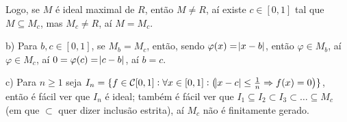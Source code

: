 \documentclass[10pt,a4paper]{article}
\begin{document}
\medskip
\noindent
Logo, se $M$ é ideal maximal de $R$, então $M\neq R$, aí existe $c\in[0,1]$ tal que $M\subseteq M_c$, mas $M_c\neq R$, aí $M=M_c$.

\medskip
\noindent
b) Para $b,c\in[0,1]$, se $M_b=M_c$, então, sendo $\varphi(x)=\abs{x-b}$, então $\varphi\in M_b$, aí $\varphi\in M_c$, aí $0=\varphi(c)=\abs{c-b}$, aí $b=c$.

\medskip
\noindent
c) Para $n\geq 1$ seja $I_n=\{f\in\mathcal{C}[0,1]:\forall x\in[0,1]:\left(\abs{x-c}\leq\frac{1}{n}\Rightarrow f(x)=0\right)\}$, então é fácil ver que $I_n$ é ideal; também é fácil ver que $I_1\subseteq I_2\subset I_3\subset\dots\subseteq M_c$ (em que $\subset$ quer dizer inclusão estrita), aí $M_c$ não é finitamente gerado.
\end{document}
